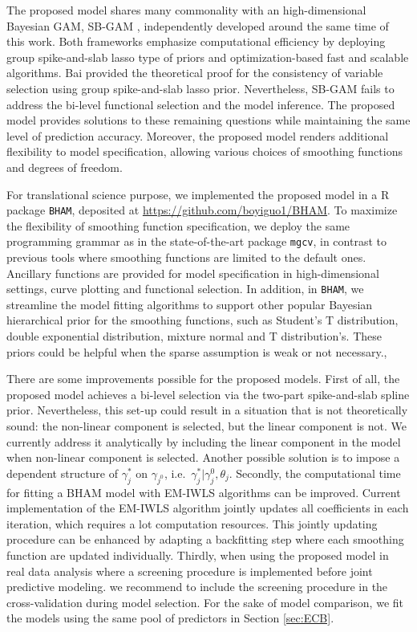 \documentclass[AMA,STIX1COL,]{WileyNJD-v2}
\begin{document}
The proposed model shares many commonality with an high-dimensional
Bayesian GAM, SB-GAM \citep{Bai2021}, independently developed around the
same time of this work. Both frameworks emphasize computational
efficiency by deploying group spike-and-slab lasso type of priors and
optimization-based fast and scalable algorithms. Bai provided the
theoretical proof for the consistency of variable selection using group
spike-and-slab lasso prior. Nevertheless, SB-GAM fails to address the
bi-level functional selection and the model inference. The proposed
model provides solutions to these remaining questions while maintaining
the same level of prediction accuracy. Moreover, the proposed model
renders additional flexibility to model specification, allowing various
choices of smoothing functions and degrees of freedom.

For translational science purpose, we implemented the proposed model in
a R package \texttt{BHAM}, deposited at
\url{https://github.com/boyiguo1/BHAM}. To maximize the flexibility of
smoothing function specification, we deploy the same programming grammar
as in the state-of-the-art package \texttt{mgcv}, in contrast to
previous tools where smoothing functions are limited to the default
ones. Ancillary functions are provided for model specification in
high-dimensional settings, curve plotting and functional selection. In
addition, in \texttt{BHAM}, we streamline the model fitting algorithms
to support other popular Bayesian hierarchical prior for the smoothing
functions, such as Student's T distribution, double exponential
distribution, mixture normal and T distribution's. These priors could be
helpful when the sparse assumption is weak or not necessary.,

There are some improvements possible for the proposed models. First of
all, the proposed model achieves a bi-level selection via the two-part
spike-and-slab spline prior. Nevertheless, this set-up could result in a
situation that is not theoretically sound: the non-linear component is
selected, but the linear component is not. We currently address it
analytically by including the linear component in the model when
non-linear component is selected. Another possible solution is to impose
a dependent structure of \(\gamma_{j}^*\) on \(\gamma_{j^{0}}\),
i.e.~\(\gamma_j^*|\gamma_{j}^{0}, \theta_j\). Secondly, the
computational time for fitting a BHAM model with EM-IWLS algorithms can
be improved. Current implementation of the EM-IWLS algorithm jointly
updates all coefficients in each iteration, which requires a lot
computation resources. This jointly updating procedure can be enhanced
by adapting a backfitting step \citep{Hastie1987} where each smoothing
function are updated individually. Thirdly, when using the proposed
model in real data analysis where a screening procedure is implemented
before joint predictive modeling. we recommend to include the screening
procedure in the cross-validation during model selection.
\citep{Friedman2017} For the sake of model comparison, we fit the models
using the same pool of predictors in Section \ref{sec:ECB}.
\end{document}
